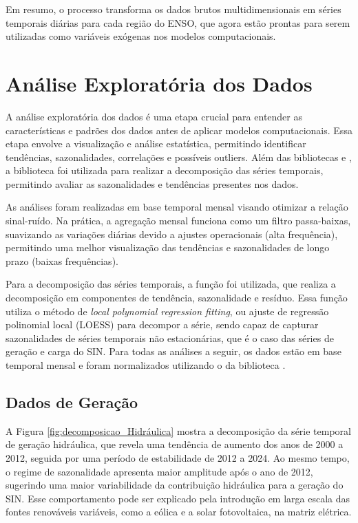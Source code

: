 Em resumo, o processo transforma os dados brutos multidimensionais em séries temporais diárias para cada região
do ENSO, que agora estão prontas para serem utilizadas como variáveis exógenas nos modelos computacionais.


\section{Análise Exploratória dos Dados} %
A análise exploratória dos dados é uma etapa crucial para entender as características e padrões dos dados antes de aplicar modelos computacionais.
Essa etapa envolve a visualização e análise estatística, permitindo identificar tendências, sazonalidades, correlações e possíveis outliers. 
Além das bibliotecas  e , a biblioteca  foi utilizada para realizar a decomposição
das séries temporais, permitindo avaliar as sazonalidades e tendências presentes nos dados.

As análises foram realizadas em base temporal mensal visando otimizar a relação sinal-ruído. Na prática, a agregação
mensal funciona como um filtro passa-baixas, suavizando as variações diárias devido a ajustes operacionais (alta frequência),
permitindo uma melhor visualização das tendências e sazonalidades de longo prazo (baixas frequências). 

Para a decomposição das séries temporais, a função  foi utilizada, que realiza a decomposição em componentes de 
tendência, sazonalidade e resíduo. Essa função utiliza o método de \textit{local polynomial regression fitting}, ou ajuste
de regressão polinomial local (LOESS) para decompor a série, sendo capaz de capturar sazonalidades de séries temporais
não estacionárias, que é o caso das séries de geração e carga do SIN. Para todas as análises a seguir, os dados estão
em base temporal mensal e foram normalizados utilizando o  da biblioteca .

\subsection{Dados de Geração} %
A Figura \ref{fig:decomposicao_Hidráulica} mostra a decomposição da série temporal de geração hidráulica, que revela uma 
tendência de aumento dos anos de 2000 a 2012, seguida por uma período de estabilidade de 2012 a 2024. Ao mesmo tempo,
o regime de sazonalidade apresenta maior amplitude após o ano de 2012, sugerindo uma maior variabilidade da contribuição
hidráulica para a geração do SIN. Esse comportamento pode ser explicado pela introdução em larga escala das fontes renováveis 
variáveis, como a eólica e a solar fotovoltaica, na matriz elétrica. \cite{Silva2016}
\begin{figure}[!ht]
  {}
  {}
\end{figure}

